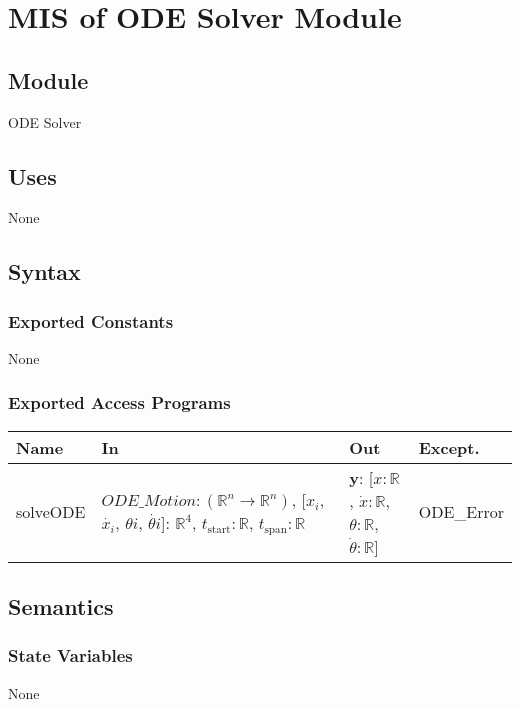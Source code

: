 \documentclass[12pt, titlepage]{article}
\begin{document}
\newpage

\section{MIS of ODE Solver Module \label{MODE}}

\subsection{Module}
ODE Solver
\subsection{Uses}

None
\subsection{Syntax}

\subsubsection{Exported Constants}
None
\subsubsection{Exported Access Programs}

\begin{center}
\begin{tabular}{p{2.5cm} >{\raggedright\arraybackslash}p{8cm} >{\raggedright\arraybackslash}p{2.43cm} p{2cm}}
  \hline
  \textbf{Name} & \textbf{In} & \textbf{Out} & \textbf{Except.} \\
  \hline
  solveODE & $ODE\_Motion: (\mathbb{R}^{n} \rightarrow \mathbb{R}^n)$, [$x_i$, $\dot{x_i}$, $\theta{i}$, $\dot{\theta{i}}$]: $\mathbb{R}^4$, $t_\text{start}: \mathbb{R}$, $t_\text{span}: \mathbb{R}$ & $\textbf{y}$: [$x: \mathbb{R}$, $\dot{x}: \mathbb{R}$, $\theta: \mathbb{R}$, $\dot{\theta}: \mathbb{R}$] & ODE\_Error\\



 
\end{tabular}
\end{center}


\subsection{Semantics}

\subsubsection{State Variables}
None
\end{document}

